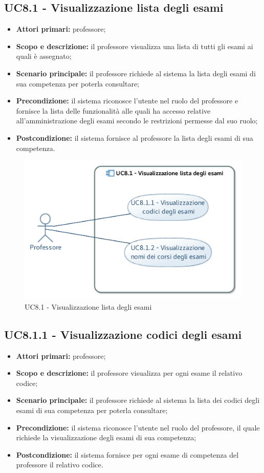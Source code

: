\documentclass[AnalisiDeiRequisiti.tex]{subfiles}
\begin{document}
\subsection{UC8.1 - Visualizzazione lista degli esami}
\begin{itemize}
	\item \textbf{Attori primari:} professore;
	\item \textbf{Scopo e descrizione:} il professore visualizza una lista di tutti gli esami ai quali è assegnato;
	\item \textbf{Scenario principale:} il professore richiede al sistema la lista degli esami di sua competenza per poterla consultare;
	\item \textbf{Precondizione:} il sistema riconosce l'utente nel ruolo del professore e fornisce la lista delle funzionalità alle quali ha accesso relative all'amministrazione degli esami secondo le restrizioni permesse dal suo ruolo; 
	\item \textbf{Postcondizione:} il sistema fornisce al professore la lista degli esami di sua competenza.
\end{itemize}
\begin{figure}[H]
	\centering
	\includegraphics[width=0.7\linewidth]{UC8_1.jpg}
	\caption{UC8.1 - Visualizzazione lista degli esami}
	\label{UC8.1 - Visualizzazione lista degli esami}
\end{figure}
\subsection{UC8.1.1 - Visualizzazione codici degli esami}
\begin{itemize}
	\item \textbf{Attori primari:} professore;
	\item \textbf{Scopo e descrizione:} il professore visualizza per ogni esame il relativo codice;
	\item \textbf{Scenario principale:} il professore richiede al sistema la lista dei codici degli esami di sua competenza per poterla consultare;
	\item \textbf{Precondizione:} il sistema riconosce l'utente nel ruolo del professore, il quale richiede la visualizzazione degli esami di sua competenza;
	\item \textbf{Postcondizione:} il sistema fornisce per ogni esame di competenza del professore il relativo codice.
\end{itemize}
\end{document}

